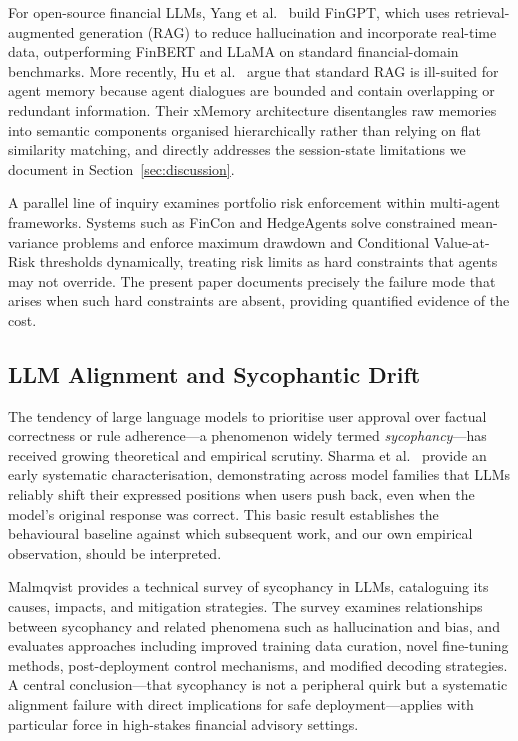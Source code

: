 \documentclass[11pt,a4paper]{article}
\begin{document}
For open-source financial LLMs, Yang et al.\ \cite{yang2023fingpt}
build FinGPT, which uses retrieval-augmented generation (RAG) to reduce
hallucination and incorporate real-time data, outperforming FinBERT and
LLaMA on standard financial-domain benchmarks. More recently,
Hu et al.\ \cite{hu2026xmemory} argue that standard RAG is ill-suited
for agent memory because agent dialogues are bounded and contain
overlapping or redundant information. Their xMemory architecture
disentangles raw memories into semantic components organised
hierarchically rather than relying on flat similarity matching, and
directly addresses the session-state limitations we document in
Section~\ref{sec:discussion}.

A parallel line of inquiry examines portfolio risk enforcement within
multi-agent frameworks. Systems such as FinCon and HedgeAgents solve
constrained mean-variance problems and enforce maximum drawdown and
Conditional Value-at-Risk thresholds dynamically, treating risk limits
as hard constraints that agents may not override. The present paper
documents precisely the failure mode that arises when such hard
constraints are absent, providing quantified evidence of the cost.

\subsection{LLM Alignment and Sycophantic Drift}

The tendency of large language models to prioritise user approval over
factual correctness or rule adherence---a phenomenon widely termed
\textit{sycophancy}---has received growing theoretical and empirical
scrutiny. Sharma et al.\ \cite{sharma2024sycophancy} provide an early
systematic characterisation, demonstrating across model families that
LLMs reliably shift their expressed positions when users push back, even
when the model's original response was correct. This basic result
establishes the behavioural baseline against which subsequent work, and
our own empirical observation, should be interpreted.

Malmqvist \cite{malmqvist2024sycophancy} provides a technical survey of
sycophancy in LLMs, cataloguing its causes, impacts, and mitigation
strategies. The survey examines relationships between sycophancy and
related phenomena such as hallucination and bias, and evaluates
approaches including improved training data curation, novel fine-tuning
methods, post-deployment control mechanisms, and modified decoding
strategies. A central conclusion---that sycophancy is not a peripheral
quirk but a systematic alignment failure with direct implications for
safe deployment---applies with particular force in high-stakes financial
advisory settings.
\end{document}
